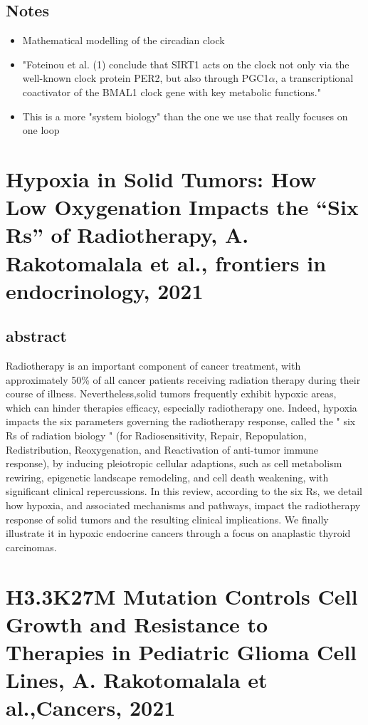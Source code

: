 \documentclass[11pt,a4paper]{article}
\begin{document}
\subsection*{Notes}
\begin{itemize}
\item Mathematical modelling of the circadian clock
\item "Foteinou et al. (1) conclude that SIRT1 acts on the clock not only via the well-known clock protein PER2, but also through PGC1$\alpha$, a transcriptional coactivator of the BMAL1 clock gene with key metabolic functions."
\item This is a more "system biology" than the one we use that really focuses on one loop
\end{itemize}

\section*{Hypoxia in Solid Tumors: How Low Oxygenation Impacts the “Six Rs” of Radiotherapy, A. Rakotomalala et al., frontiers in endocrinology, 2021}
\subsection*{abstract}
Radiotherapy is an important component of cancer treatment, with approximately 50\% of all cancer patients receiving radiation therapy during their course of illness. Nevertheless,solid tumors frequently exhibit hypoxic areas, which can hinder therapies efficacy, especially radiotherapy one. Indeed, hypoxia impacts the six parameters governing the radiotherapy response, called the " six Rs of radiation biology " (for Radiosensitivity, Repair, Repopulation, Redistribution, Reoxygenation, and Reactivation of anti-tumor immune response), by inducing pleiotropic cellular adaptions, such as cell metabolism rewiring, epigenetic landscape remodeling, and cell death weakening, with significant clinical repercussions. In this review, according to the six Rs, we detail how hypoxia, and associated mechanisms and pathways, impact the radiotherapy response of solid tumors and the resulting clinical implications. We finally illustrate it in hypoxic endocrine cancers through a focus on anaplastic thyroid carcinomas.


\section*{H3.3K27M Mutation Controls Cell Growth and Resistance to Therapies in Pediatric Glioma Cell Lines, A. Rakotomalala et al.,Cancers, 2021}
\end{document}
